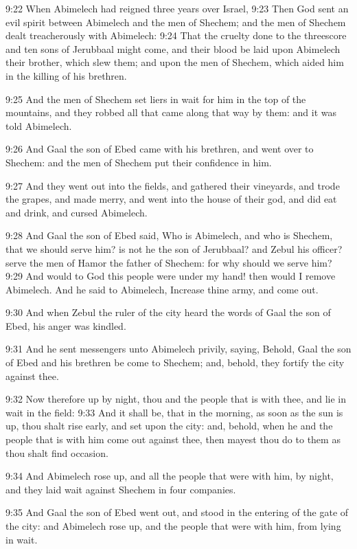 9:22 When Abimelech had reigned three years over Israel, 9:23 Then God sent an evil spirit between Abimelech and the men of Shechem; and the men of Shechem dealt treacherously with Abimelech: 9:24 That the cruelty done to the threescore and ten sons of Jerubbaal might come, and their blood be laid upon Abimelech their brother, which slew them; and upon the men of Shechem, which aided him in the killing of his brethren.

9:25 And the men of Shechem set liers in wait for him in the top of the mountains, and they robbed all that came along that way by them: and it was told Abimelech.

9:26 And Gaal the son of Ebed came with his brethren, and went over to Shechem: and the men of Shechem put their confidence in him.

9:27 And they went out into the fields, and gathered their vineyards, and trode the grapes, and made merry, and went into the house of their god, and did eat and drink, and cursed Abimelech.

9:28 And Gaal the son of Ebed said, Who is Abimelech, and who is Shechem, that we should serve him? is not he the son of Jerubbaal? and Zebul his officer? serve the men of Hamor the father of Shechem: for why should we serve him?  9:29 And would to God this people were under my hand! then would I remove Abimelech. And he said to Abimelech, Increase thine army, and come out.

9:30 And when Zebul the ruler of the city heard the words of Gaal the son of Ebed, his anger was kindled.

9:31 And he sent messengers unto Abimelech privily, saying, Behold, Gaal the son of Ebed and his brethren be come to Shechem; and, behold, they fortify the city against thee.

9:32 Now therefore up by night, thou and the people that is with thee, and lie in wait in the field: 9:33 And it shall be, that in the morning, as soon as the sun is up, thou shalt rise early, and set upon the city: and, behold, when he and the people that is with him come out against thee, then mayest thou do to them as thou shalt find occasion.

9:34 And Abimelech rose up, and all the people that were with him, by night, and they laid wait against Shechem in four companies.

9:35 And Gaal the son of Ebed went out, and stood in the entering of the gate of the city: and Abimelech rose up, and the people that were with him, from lying in wait.

